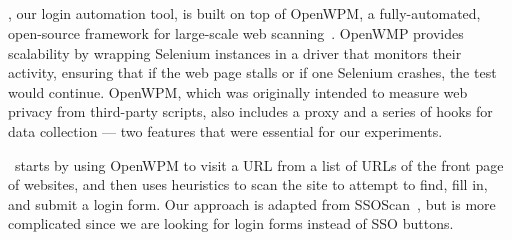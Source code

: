 \subsection{\SwapScan} \label{swap_scan}

\SwapScan, our login automation tool, is built on top of OpenWPM, a fully-automated, open-source framework for large-scale web scanning~\cite{englehardt2016census}. OpenWMP provides scalability by wrapping Selenium instances in a driver that monitors their activity, ensuring that if the web page stalls or if one Selenium crashes, the test would continue. OpenWPM, which was originally intended to measure web privacy from third-party scripts, also includes a proxy and a series of hooks for data collection --- two features that were essential for our experiments. 

\SwapScan\ starts by using OpenWPM to visit a URL from a list of URLs of the front page of websites, and then uses heuristics to scan the site to attempt to find, fill in, and submit a login form. Our approach is adapted from SSOScan~\cite{Zhou2014}, but is more complicated since we are looking for login forms instead of SSO buttons. 

